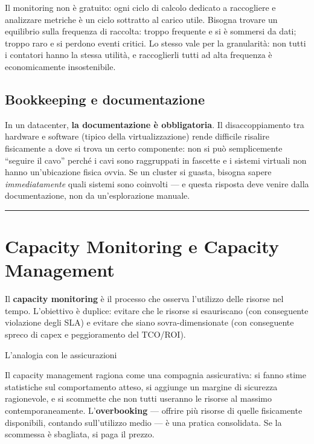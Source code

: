 \documentclass[
  italian,
  openany]{book}
\begin{document}
Il monitoring non è gratuito: ogni ciclo di calcolo dedicato a
raccogliere e analizzare metriche è un ciclo sottratto al carico utile.
Bisogna trovare un equilibrio sulla frequenza di raccolta: troppo
frequente e si è sommersi da dati; troppo raro e si perdono eventi
critici. Lo stesso vale per la granularità: non tutti i contatori hanno
la stessa utilità, e raccoglierli tutti ad alta frequenza è
economicamente insostenibile.

\subsection{Bookkeeping e
documentazione}\label{bookkeeping-e-documentazione}

In un datacenter, \textbf{la documentazione è obbligatoria}. Il
disaccoppiamento tra hardware e software (tipico della virtualizzazione)
rende difficile risalire fisicamente a dove si trova un certo
componente: non si può semplicemente ``seguire il cavo'' perché i cavi
sono raggruppati in fascette e i sistemi virtuali non hanno
un'ubicazione fisica ovvia. Se un cluster si guasta, bisogna sapere
\emph{immediatamente} quali sistemi sono coinvolti --- e questa risposta
deve venire dalla documentazione, non da un'esplorazione manuale.

\begin{center}\rule{0.5\linewidth}{0.5pt}\end{center}

\section{Capacity Monitoring e Capacity
Management}\label{capacity-monitoring-e-capacity-management}

Il \textbf{capacity monitoring} è il processo che osserva l'utilizzo
delle risorse nel tempo. L'obiettivo è duplice: evitare che le risorse
si esauriscano (con conseguente violazione degli SLA) e evitare che
siano sovra-dimensionate (con conseguente spreco di capex e
peggioramento del TCO/ROI).

\begin{callouttip}{L’analogia con le assicurazioni}

Il capacity management ragiona come una compagnia assicurativa: si fanno
stime statistiche sul comportamento atteso, si aggiunge un margine di
sicurezza ragionevole, e si scommette che non tutti useranno le risorse
al massimo contemporaneamente. L'\textbf{overbooking} --- offrire più
risorse di quelle fisicamente disponibili, contando sull'utilizzo medio
--- è una pratica consolidata. Se la scommessa è sbagliata, si paga il
prezzo.

\end{callouttip}
\end{document}
